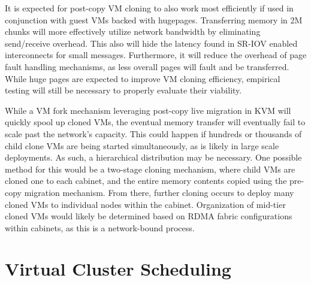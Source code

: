 It is expected for post-copy VM cloning to also work most efficiently if used in conjunction with guest VMs backed with hugepages. Transferring memory in 2M chunks will more effectively utilize network bandwidth by eliminating send/receive overhead. This also will hide the latency found in SR-IOV enabled interconnects for small messages. Furthermore, it will reduce the overhead of page fault handling mechanisms, as less overall pages will fault and be transferred.  While huge pages are expected to improve VM cloning efficiency, empirical testing will still be necessary to properly evaluate their viability.   

While a VM fork mechanism leveraging post-copy live migration in KVM will quickly spool up cloned VMs, the eventual memory transfer will eventually fail to scale past the network's capacity. This could happen if hundreds or thousands of child clone VMs are being started simultaneously, as is likely in large scale deployments. As such, a hierarchical distribution may be necessary. One possible method for this would be a two-stage cloning mechanism, where child VMs are cloned one to each cabinet, and the entire memory contents copied using the pre-copy migration mechanism. From there, further cloning occurs to deploy many cloned VMs to individual nodes within the cabinet. Organization of mid-tier cloned VMs would likely be determined based on RDMA fabric configurations within cabinets, as this is a network-bound process. 





\section{Virtual Cluster Scheduling}
\label{vcsched}


